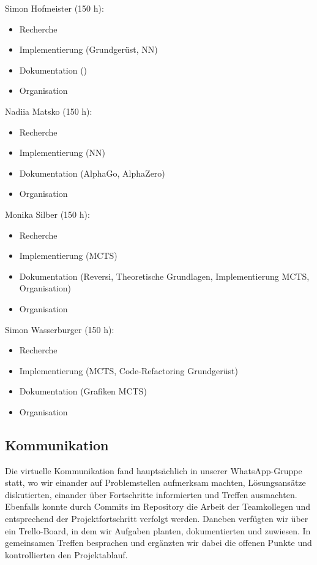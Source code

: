 \documentclass[12pt,a4paper]{article}
\begin{document}
Simon Hofmeister (150 h):
\begin{itemize}
\item Recherche
\item Implementierung (Grundgerüst, NN)
\item Dokumentation ()
\item Organisation
\end{itemize}       

Nadiia Matsko (150 h): 
\begin{itemize}
\item Recherche
\item Implementierung (NN)
\item Dokumentation (AlphaGo, AlphaZero)
\item Organisation
\end{itemize}  

Monika Silber (150 h): 
\begin{itemize}
\item Recherche
\item Implementierung (MCTS)
\item Dokumentation (Reversi, Theoretische Grundlagen, Implementierung MCTS, Organisation)
\item Organisation
\end{itemize}  

Simon Wasserburger (150 h): 
\begin{itemize}
\item Recherche
\item Implementierung (MCTS, Code-Refactoring Grundgerüst)
\item Dokumentation (Grafiken MCTS)
\item Organisation
\end{itemize}  

\subsection{Kommunikation}
Die virtuelle Kommunikation fand hauptsächlich in unserer WhatsApp-Gruppe statt, wo wir einander auf Problemstellen aufmerksam machten, Lösungsansätze diskutierten, einander über Fortschritte informierten und Treffen ausmachten. Ebenfalls konnte durch Commits im Repository die Arbeit der Teamkollegen und entsprechend der Projektfortschritt verfolgt werden. Daneben verfügten wir über ein Trello-Board, in dem wir Aufgaben planten, dokumentierten und zuwiesen. In gemeinsamen Treffen besprachen und ergänzten wir dabei die offenen Punkte und kontrollierten den Projektablauf. 
\end{document}
